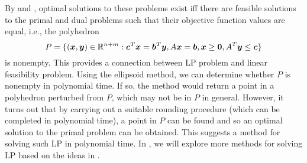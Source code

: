 \begin{enumerate}
By  and ,
optimal solutions to these problems exist iff there are feasible solutions to
the primal and dual problems such that their objective function values are
equal, i.e., the polyhedron
\[
P=\{(\bm{x},\bm{y})\in \mathbb{R}^{n+m}: \bm{c}^{T}\bm{x}=\bm{b}^{T}\bm{y},
A\bm{x}=\bm{b}, \bm{x}\ge\bm{0}, A^{T}\bm{y}\le\bm{c}\}
\]
is nonempty. This provides a connection between LP problem and linear
feasibility problem. Using the ellipsoid method, we can determine whether \(P\)
is nonempty in polynomial time. If so, the method would return a point
in a polyhedron perturbed from \(P\), which may not be in \(P\) in general.
However, it turns out that by carrying out a suitable rounding procedure (which
can be completed in polynomial time), a point in \(P\) can be found and so an
optimal solution to the primal problem can be obtained. This suggests a method
for solving such LP in polynomial time. In , we will
explore more methods for solving LP based on the ideas in .
\end{enumerate}
